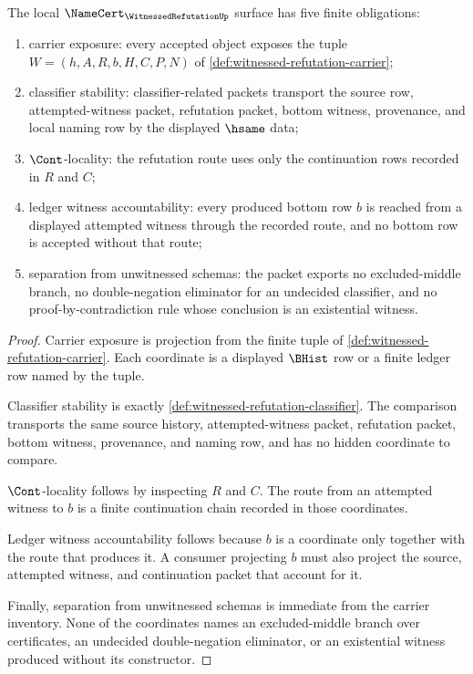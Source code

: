 \begin{theorem}
\label{thm:witnessed-refutation-namecert-obligations}
The local $\NameCert_{\WitnessedRefutationUp}$ surface has five finite obligations:
\begin{enumerate}
\item carrier exposure: every accepted object exposes the tuple $W=(h,A,R,b,H,C,P,N)$ of \autoref{def:witnessed-refutation-carrier};
\item classifier stability: classifier-related packets transport the source row, attempted-witness packet, refutation packet, bottom witness, provenance, and local naming row by the displayed $\hsame$ data;
\item $\Cont$-locality: the refutation route uses only the continuation rows recorded in $R$ and $C$;
\item ledger witness accountability: every produced bottom row $b$ is reached from a displayed attempted witness through the recorded route, and no bottom row is accepted without that route;
\item separation from unwitnessed schemas: the packet exports no excluded-middle branch, no double-negation eliminator for an undecided classifier, and no proof-by-contradiction rule whose conclusion is an existential witness.
\end{enumerate}
\end{theorem}
\begin{proof}
Carrier exposure is projection from the finite tuple of \autoref{def:witnessed-refutation-carrier}. Each coordinate is a displayed $\BHist$ row or a finite ledger row named by the tuple.

Classifier stability is exactly \autoref{def:witnessed-refutation-classifier}. The comparison transports the same source history, attempted-witness packet, refutation packet, bottom witness, provenance, and naming row, and has no hidden coordinate to compare.

$\Cont$-locality follows by inspecting $R$ and $C$. The route from an attempted witness to $b$ is a finite continuation chain recorded in those coordinates.

Ledger witness accountability follows because $b$ is a coordinate only together with the route that produces it. A consumer projecting $b$ must also project the source, attempted witness, and continuation packet that account for it.

Finally, separation from unwitnessed schemas is immediate from the carrier inventory. None of the coordinates names an excluded-middle branch over certificates, an undecided double-negation eliminator, or an existential witness produced without its constructor.
\end{proof}

